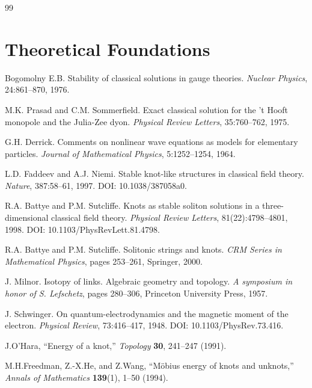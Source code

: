 \documentclass[11pt,a4paper]{article}
\begin{document}
	\begin{thebibliography}{99}
		
		\section*{Theoretical Foundations}
		
		Bogomolny E.B.
		\newblock Stability of classical solutions in gauge theories.
		\newblock \textit{Nuclear Physics}, 24:861--870, 1976.
		
		M.K. Prasad and C.M. Sommerfield.
		\newblock Exact classical solution for the 't Hooft monopole and the Julia-Zee dyon.
		\newblock \textit{Physical Review Letters}, 35:760--762, 1975.
		
		G.H. Derrick.
		\newblock Comments on nonlinear wave equations as models for elementary particles.
		\newblock \textit{Journal of Mathematical Physics}, 5:1252--1254, 1964.
		
		L.D. Faddeev and A.J. Niemi.
		\newblock Stable knot-like structures in classical field theory.
		\newblock \textit{Nature}, 387:58--61, 1997.
		\newblock DOI: 10.1038/387058a0.
		
		R.A. Battye and P.M. Sutcliffe.
		\newblock Knots as stable soliton solutions in a three-dimensional classical field theory.
		\newblock \textit{Physical Review Letters}, 81(22):4798--4801, 1998.
		\newblock DOI: 10.1103/PhysRevLett.81.4798.
		
		R.A. Battye and P.M. Sutcliffe.
		\newblock Solitonic strings and knots.
		\newblock \textit{CRM Series in Mathematical Physics}, pages 253--261, Springer, 2000.
		
		J. Milnor.
		\newblock Isotopy of links. Algebraic geometry and topology.
		\newblock \textit{A symposium in honor of S. Lefschetz}, pages 280--306, Princeton University Press, 1957.
		
		J. Schwinger.
		\newblock On quantum-electrodynamics and the magnetic moment of the electron.
		\newblock \textit{Physical Review}, 73:416--417, 1948.
		\newblock DOI: 10.1103/PhysRev.73.416.
		
		 J.O'Hara, ``Energy of a knot,''
		\textit{Topology}
		\textbf{30}, 241--247 (1991).
		
		 M.H.Freedman, Z.-X.He, and Z.Wang, ``Möbius energy of knots and unknots,''
		\textit{Annals of Mathematics}
		\textbf{139}(1), 1--50 (1994).
		

\end{thebibliography}
\end{document}
